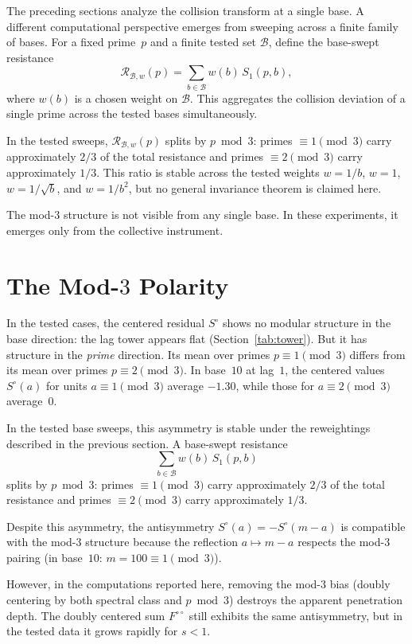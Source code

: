 \documentclass[12pt]{amsart}
\theoremstyle{definition}
\theoremstyle{remark}
\begin{document}
The preceding sections analyze the collision transform at a
single base. A different computational perspective emerges
from sweeping across a finite family of bases. For a fixed
prime~$p$ and a finite tested set $\mathcal{B}$, define the
base-swept resistance
\[
\mathcal{R}_{\mathcal{B},w}(p) = \sum_{b \in \mathcal{B}} w(b)\, S_1(p, b),
\]
where $w(b)$ is a chosen weight on $\mathcal{B}$. This
aggregates the collision deviation of a single prime across
the tested bases simultaneously.

In the tested sweeps, $\mathcal{R}_{\mathcal{B},w}(p)$
splits by $p \bmod 3$: primes $\equiv 1 \pmod{3}$ carry
approximately $2/3$ of the total resistance and primes
$\equiv 2 \pmod{3}$ carry approximately $1/3$. This ratio
is stable across the tested weights $w = 1/b$, $w = 1$,
$w = 1/\sqrt{b}$, and $w = 1/b^2$, but no general
invariance theorem is claimed here.

The mod-$3$ structure is not visible from any single base.
In these experiments, it emerges only from the collective
instrument.

\section{The Mod-$3$ Polarity}

In the tested cases, the centered residual $S^{\circ}$
shows no modular structure in the base direction: the
lag tower appears flat (Section~\ref{tab:tower}). But
it has structure in the \emph{prime} direction.
Its mean over primes $p \equiv 1 \pmod{3}$ differs from
its mean over primes $p \equiv 2 \pmod{3}$. In base~$10$
at lag~$1$, the centered values $S^{\circ}(a)$ for units
$a \equiv 1 \pmod{3}$ average $-1.30$, while those for
$a \equiv 2 \pmod{3}$ average~$0$.

In the tested base sweeps, this asymmetry is stable
under the reweightings described in the previous
section.  A base-swept resistance
\[
\textstyle\sum_{b \in \mathcal{B}} w(b)\, S_1(p, b)
\]
splits by $p \bmod 3$: primes $\equiv 1 \pmod{3}$
carry approximately $2/3$ of the total resistance
and primes $\equiv 2 \pmod{3}$ carry approximately
$1/3$.

Despite this asymmetry, the antisymmetry
$S^{\circ}(a) = -S^{\circ}(m{-}a)$ is compatible with the
mod-$3$ structure because the reflection $a \mapsto m - a$
respects the mod-$3$ pairing (in base~$10$:
$m = 100 \equiv 1 \pmod{3}$).

However, in the computations reported here, removing the
mod-$3$ bias (doubly centering by both spectral class and
$p \bmod 3$) destroys the apparent penetration depth. The
doubly centered sum $F^{\circ\circ}$ still exhibits the
same antisymmetry, but in the tested data it grows rapidly
for $s < 1$.
\end{document}
